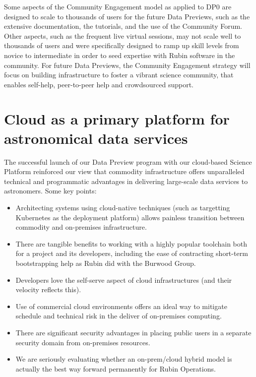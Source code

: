 \documentclass[11pt,twoside]{article}
\begin{document}
Some aspects of the Community Engagement model as applied to DP0 are designed to scale to thousands of users for the future Data Previews, such as the extensive documentation, the tutorials, and the use of the Community Forum.
Other aspects, such as the frequent live virtual sessions, may not scale well to thousands of users and were specifically designed to ramp up skill levels from novice to intermediate in order to seed expertise with Rubin software in the community.
For future Data Previews, the Community Engagement strategy will focus on building infrastructure to foster a vibrant science community, that enables self-help, peer-to-peer help and crowdsourced support.

\section{Cloud as a primary platform for astronomical data services}

The successful launch of our Data Preview program with our cloud-based Science Platform reinforced our view that commodity infrastructure offers unparalleled technical and programmatic advantages in delivering large-scale data services to astronomers. Some key points:

\begin{itemize}

    \item Architecting systems using cloud-native techniques (such as targetting Kubernetes as the deployment platform) allows painless transition between commodity and on-premises infrastructure.
    \item There are tangible benefits to working with a highly popular toolchain both for a project and its developers, including the ease of contracting short-term bootstrapping help as Rubin did with the Burwood Group.
    \item Developers love the self-serve aspect of cloud infrastructures (and their velocity reflects this).
    \item Use of commercial cloud environments offers an ideal way to mitigate schedule and technical risk in the deliver of on-premises computing.
    \item There are significant security advantages in placing public users in a separate security domain from on-premises resources.
    \item We are seriously evaluating whether an on-prem/cloud hybrid model is actually the best way forward permanently for Rubin Operations.
\end{itemize}
\end{document}
